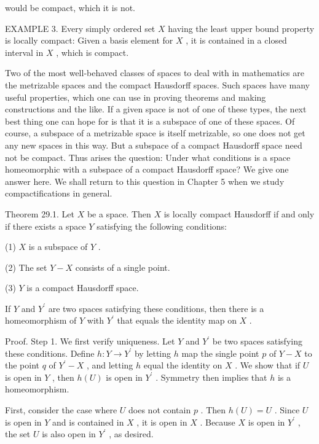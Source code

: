 would be compact, which it is not.

EXAMPLE 3. Every simply ordered set \(X\) having the least upper bound property is locally compact: Given a basis element for \(X\) , it is contained in a closed interval in \(X\) , which is compact.

Two of the most well-behaved classes of spaces to deal with in mathematics are the metrizable spaces and the compact Hausdorff spaces. Such spaces have many useful properties, which one can use in proving theorems and making constructions and the like. If a given space is not of one of these types, the next best thing one can hope for is that it is a subspace of one of these spaces. Of course, a subspace of a metrizable space is itself metrizable, so one does not get any new spaces in this way. But a subspace of a compact Hausdorff space need not be compact. Thus arises the question: Under what conditions is a space homeomorphic with a subspace of a compact Hausdorff space? We give one answer here. We shall return to this question in Chapter 5 when we study compactifications in general.

Theorem 29.1. Let \(X\) be a space. Then \(X\) is locally compact Hausdorff if and only if there exists a space \(Y\) satisfying the following conditions:

(1) \(X\) is a subspace of \(Y\) .

(2) The set \(Y - X\) consists of a single point.

(3) \(Y\) is a compact Hausdorff space.

If \(Y\) and \({Y}^{\prime }\) are two spaces satisfying these conditions, then there is a homeomorphism of \(Y\) with \({Y}^{\prime }\) that equals the identity map on \(X\) .

Proof. Step 1. We first verify uniqueness. Let \(Y\) and \({Y}^{\prime }\) be two spaces satisfying these conditions. Define \(h : Y \rightarrow  {Y}^{\prime }\) by letting \(h\) map the single point \(p\) of \(Y - X\) to the point \(q\) of \({Y}^{\prime } - X\) , and letting \(h\) equal the identity on \(X\) . We show that if \(U\) is open in \(Y\) , then \(h\left( U\right)\) is open in \({Y}^{\prime }\) . Symmetry then implies that \(h\) is a homeomorphism.

First, consider the case where \(U\) does not contain \(p\) . Then \(h\left( U\right)  = U\) . Since \(U\) is open in \(Y\) and is contained in \(X\) , it is open in \(X\) . Because \(X\) is open in \({Y}^{\prime }\) , the set \(U\) is also open in \({Y}^{\prime }\) , as desired.

